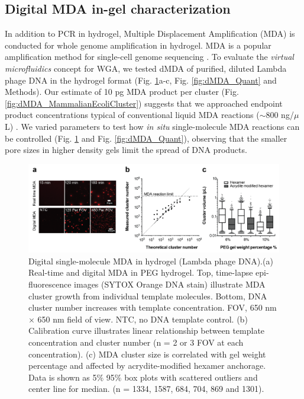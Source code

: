 \subsection{Digital MDA in-gel characterization}
In addition to PCR in hydrogel, Multiple Displacement Amplification (MDA) is conducted for whole genome amplification in hydrogel. MDA \cite{Dean:2002us} is a popular amplification method for single-cell genome sequencing \cite{Marcy:2007il,Fu:2015gl,Zhang:2006hq,Raghunathan:2005fg,Pamp:2012cj,Dodsworth:2013ih,Hess:2011gu}. To evaluate the \textit{virtual microfluidics} concept for WGA, we tested dMDA \cite{Morinishi:2015jx,Blainey:2011dt} of purified, diluted Lambda phage DNA in the hydrogel format (Fig. \ref{fig:dMDA}a-c, Fig. \ref{fig:dMDA_Quant} and Methods). Our estimate of 10 pg MDA product per cluster (Fig. \ref{fig:dMDA_MammalianEcoliCluster}) suggests that we approached endpoint product concentrations typical of conventional liquid MDA reactions (\ensuremath{\sim}800 ng\slash $\mu$L) \cite{Blainey:2013dp}. We varied parameters to test how \textit{in situ} single-molecule MDA reactions can be controlled (Fig. \ref{fig:dMDA} and Fig. \ref{fig:dMDA_Quant}), observing that the smaller pore sizes in higher density gels limit the spread of DNA products.

\begin{figure}
\centering
\includegraphics[keepaspectratio,width=1\textwidth]{./figures/Thesis-21.png}
\caption[Digital single-molecule MDA in hydrogel (Lambda phage DNA).]{Digital single-molecule MDA in hydrogel (Lambda phage DNA).(a) Real-time and digital MDA in PEG hydrogel. Top, time-lapse
epi-fluorescence images (SYTOX Orange DNA stain) illustrate MDA cluster growth from individual template molecules. Bottom, DNA cluster number increases with template concentration. FOV, 650 nm $\times$ 650 nm field of view. NTC, no DNA template control. (b) Calibration curve illustrates linear relationship between template concentration and cluster number (n = 2 or 3 FOV at
each concentration). (c) MDA cluster size is correlated with gel weight percentage and affected by acrydite-modified hexamer anchorage. Data is shown as 5$\%$ {\textendash} 95$\%$ box plots with scattered outliers and center line for median. (n = 1334, 1587, 684, 704, 869 and 1301).}
\label{fig:dMDA}
\end{figure}

